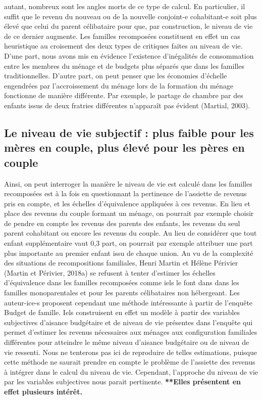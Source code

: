 \documentclass[
  12pt,
]{book}
\begin{document}
autant, nombreux sont les angles morts de ce type de calcul. En
particulier, il suffit que le revenu du nouveau ou de la nouvelle
conjoint-e cohabitant-e soit plus élevé que celui du parent célibataire
pour que, par construction, le niveau de vie de ce dernier augmente. Les
familles recomposées constituent en effet un cas heuristique au
croisement des deux types de critiques faites au niveau de vie. D'une
part, nous avons mis en évidence l'existence d'inégalités de
consommation entre les membres du ménage et de budgets plus séparés que
dans les familles traditionnelles. D'autre part, on peut penser que les
économies d'échelle engendrées par l'accroissement du ménage lors de la
formation du ménage fonctionne de manière différente. Par exemple, le
partage de chambre par des enfants issus de deux fratries différentes
n'apparaît pas évident (Martial, 2003).

\subsection{Le niveau de vie subjectif : plus faible pour les mères en
couple, plus élevé pour les pères en
couple}\label{le-niveau-de-vie-subjectif-plus-faible-pour-les-muxe8res-en-couple-plus-uxe9levuxe9-pour-les-puxe8res-en-couple}

Ainsi, on peut interroger la manière le niveau de vie est calculé dans
les familles recomposées est à la fois en questionnant la pertinence de
l'assiette de revenus pris en compte, et les échelles d'équivalence
appliquées à ces revenus. En lieu et place des revenus du couple formant
un ménage, on pourrait par exemple choisir de pendre en compte les
revenus des parents des enfants, les revenus du seul parent cohabitant
ou encore les revenus du couple. Au lieu de considérer que tout enfant
supplémentaire vaut 0,3 part, on pourrait par exemple attribuer une part
plus importante au premier enfant issu de chaque union. Au vu de la
complexité des situations de recompositions familiales, Henri Martin et
Hélène Périvier (Martin et Périvier, 2018a) se refusent à tenter
d'estimer les échelles d'équivalence dans les familles recomposées comme
iels le font dans dans les familles monoparentales et pour les parents
célibataires non hébergeant. Les auteur-ice-s proposent cependant une
méthode intéressante à partir de l'enquête Budget de famille. Iels
construisent en effet un modèle à partir des variables subjectives
d'aisance budgétaire et de niveau de vie présentes dans l'enquête qui
permet d'estimer les revenus nécessaires aux ménages aux configuration
familiales différentes pour atteindre le même niveau d'aisance
budgétaire ou de niveau de vie ressenti. Nous ne tenterons pas ici de
reproduire de telles estimations, puisque cette méthode ne saurait
prendre en compte le problème de l'assiette des revenus à intégrer dans
le calcul du niveau de vie. Cependant, l'approche du niveau de vie par
les variables subjectives nous parait pertinente. \textbf{**Elles
présentent en effet plusieurs intérêt.}
\end{document}
